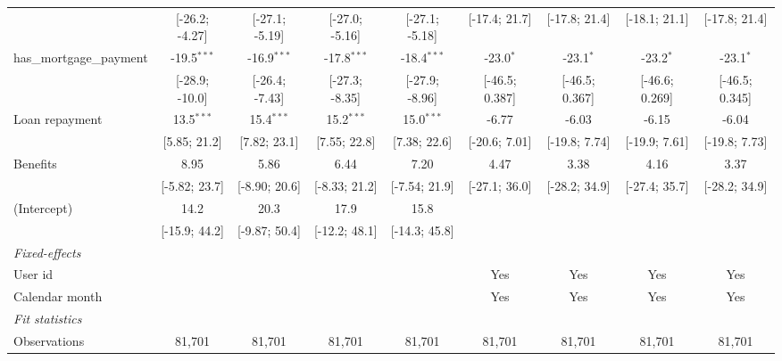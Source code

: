 \begin{table}[htbp]
\begin{threeparttable}[b]
\begin{tabular}{lcccccccc}
                                   & [-26.2; -4.27]  & [-27.1; -5.19]  & [-27.0; -5.16]  & [-27.1; -5.18]  & [-17.4; 21.7]   & [-17.8; 21.4]   & [-18.1; 21.1]   & [-17.8; 21.4]\\   
         has\_mortgage\_payment    & -19.5$^{***}$   & -16.9$^{***}$   & -17.8$^{***}$   & -18.4$^{***}$   & -23.0$^{*}$     & -23.1$^{*}$     & -23.2$^{*}$     & -23.1$^{*}$\\   
                                   & [-28.9; -10.0]  & [-26.4; -7.43]  & [-27.3; -8.35]  & [-27.9; -8.96]  & [-46.5; 0.387]  & [-46.5; 0.367]  & [-46.6; 0.269]  & [-46.5; 0.345]\\   
         Loan repayment            & 13.5$^{***}$    & 15.4$^{***}$    & 15.2$^{***}$    & 15.0$^{***}$    & -6.77           & -6.03           & -6.15           & -6.04\\   
                                   & [5.85; 21.2]    & [7.82; 23.1]    & [7.55; 22.8]    & [7.38; 22.6]    & [-20.6; 7.01]   & [-19.8; 7.74]   & [-19.9; 7.61]   & [-19.8; 7.73]\\   
         Benefits                  & 8.95            & 5.86            & 6.44            & 7.20            & 4.47            & 3.38            & 4.16            & 3.37\\   
                                   & [-5.82; 23.7]   & [-8.90; 20.6]   & [-8.33; 21.2]   & [-7.54; 21.9]   & [-27.1; 36.0]   & [-28.2; 34.9]   & [-27.4; 35.7]   & [-28.2; 34.9]\\   
         (Intercept)               & 14.2            & 20.3            & 17.9            & 15.8            &                 &                 &                 &   \\   
                                   & [-15.9; 44.2]   & [-9.87; 50.4]   & [-12.2; 48.1]   & [-14.3; 45.8]   &                 &                 &                 &   \\   
         \midrule
         \emph{Fixed-effects}\\
         User id                   &                 &                 &                 &                 & Yes             & Yes             & Yes             & Yes\\  
         Calendar month            &                 &                 &                 &                 & Yes             & Yes             & Yes             & Yes\\  
         \midrule
         \emph{Fit statistics}\\
         Observations              & 81,701          & 81,701          & 81,701          & 81,701          & 81,701          & 81,701          & 81,701          & 81,701\\  

\end{tabular}
\end{threeparttable}
\end{table}
